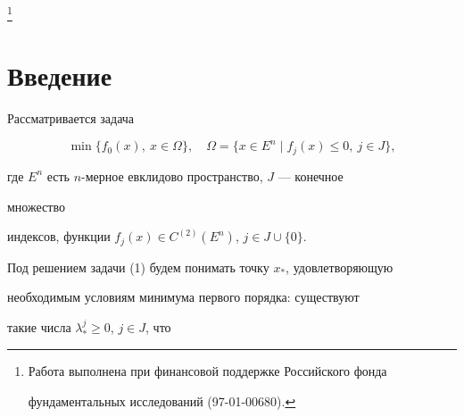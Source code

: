  


\thanks{Работа выполнена при финансовой поддержке Российского фонда 


фундаментальных исследований (97-01-00680).} 


\date{} 




 


\pagestyle{plain} %


 


 




 


\maketitle 


\label{begin} 


 


 


\section*{Введение} 


 


Рассматривается задача 


\begin{equation} 


\min\{f_0(x),\ x\in\Omega\},\quad \Omega=\{x\in E^n\mid 


f_j(x)\le 0,\ j\in J\}, 


\end{equation} 


где $E^n$ есть $n$-мерное евклидово пространство, $J$ --- конечное 


множество 


индексов, функции $f_j(x)\in C^{(2)}(E^n)$, $j\in J\cup\{0\}$. 


 


Под решением задачи (1) будем понимать точку $x_*$, удовлетворяющую 


необходимым условиям минимума первого порядка: существуют 


такие числа $\lambda^j_*\ge 0$, $j\in J$, что 


